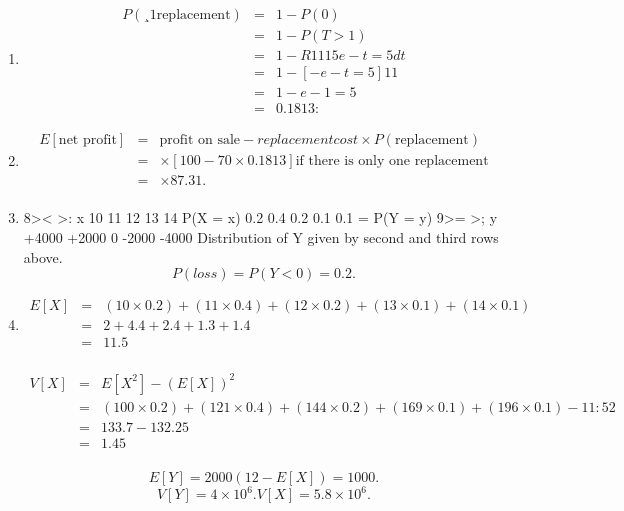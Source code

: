 \documentclass[a4paper,12pt]{article}
\begin{document}
\begin{enumerate}
\item 
\begin{eqnarray*}
P(¸1 \mbox{replacement})&=&1-P(0)
\\&=&1-P(T>1)
\\&=&1-
R1
1
1
5 e-t=5dt
\\&=&1 - [-e-t=5]1
1 
\\&=&1 - e-1=5 \\&=& 0.1813:
\end{eqnarray*}
\item
\begin{eqnarray*}
E[\mbox{net profit}]
&=& \mbox{profit on sale} - replacement cost \times  P(\mbox{replacement})\\
&=& \times [100-70\times 0.1813] \mbox{if there is only one replacement}\\
&=& \times 87.31 .\\
\end{eqnarray*}
\item 
8><
>:
x 10 11 12 13 14
P(X = x) 0.2 0.4 0.2 0.1 0.1 = P(Y = y)
9>=
>;
y +4000 +2000 0 -2000 -4000
Distribution of Y given by second and third rows above.
\[P(loss)=P(Y<0)=0.2 .\]

\item 
\begin{eqnarray*}
E[X]&=&(10\times 0.2)+(11\times 0.4)+(12\times 0.2)+(13\times 0.1)+(14\times 0.1)\\
&=& 2 + 4.4 + 2.4 + 1.3+ 1.4\\
&=&11.5\\
\end{eqnarray*}

\begin{eqnarray*}
V[X] 
&=& E[X^2] - (E[X])^2\\
&=& (100 \times  0.2) + (121 \times  0.4) + (144 \times  0.2) + (169 \times  0.1) + (196 \times  0.1) - 11:52\\
&=& 133.7 - 132.25\\ 
&=& 1.45\\
\end{eqnarray*}

\[E[Y]=2000(12-E[X])= 1000 .\]
\[V[Y]=4\times 10^6 . V[X]=5.8\times 10^6 .\]
\end{enumerate}
\end{document}
